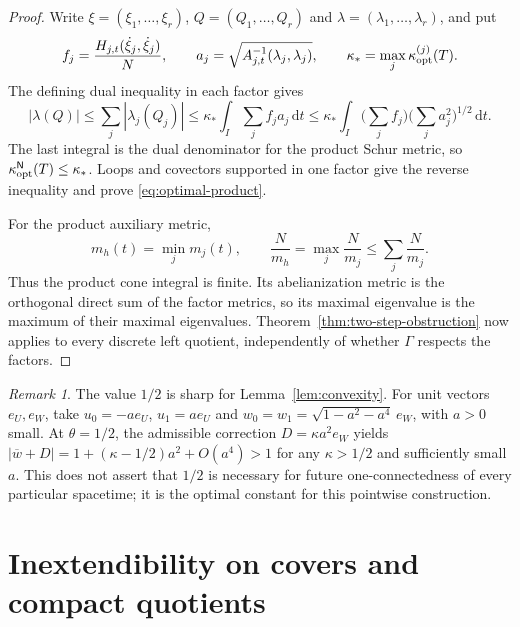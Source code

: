 \documentclass[10pt,a4paper]{article}
\numberwithin{equation}{section}
\theoremstyle{definition}
\theoremstyle{remark}
\newtheorem{remark}[theorem]{Remark}
\newcommand{\dd}{\mathrm d}
\begin{document}
\begin{proof}
Write $\xi=(\xi_1,\ldots,\xi_r)$,
$Q=(Q_1,\ldots,Q_r)$ and
$\lambda=(\lambda_1,\ldots,\lambda_r)$, and put
\[
 f_j=\frac{H_{j,t}(\dot\xi_j,\dot\xi_j)}{N},\qquad
 a_j=\sqrt{A_{j,t}^{-1}(\lambda_j,\lambda_j)},\qquad
 \kappa_*=\max_j\kappa_{\rm opt}^{(j)}(T).
\]
The defining dual inequality in each factor gives
\[
 |\lambda(Q)|
 \le\sum_j|\lambda_j(Q_j)|
 \le\kappa_*\int_I\sum_j f_ja_j\,\dd t
 \le\kappa_*\int_I
       \Big(\sum_jf_j\Big)\Big(\sum_ja_j^2\Big)^{1/2}\,\dd t.
\]
The last integral is the dual denominator for the product Schur metric,
so $\kappa_{\rm opt}^{\mathsf N}(T)\le\kappa_*$.  Loops and covectors
supported in one factor give the reverse inequality and prove
\eqref{eq:optimal-product}.

For the product auxiliary metric,
\[
 m_h(t)=\min_jm_j(t),\qquad
 \frac{N}{m_h}=\max_j\frac{N}{m_j}
 \le\sum_j\frac{N}{m_j}.
\]
Thus the product cone integral is finite.  Its abelianization metric is
the orthogonal direct sum of the factor metrics, so its maximal
eigenvalue is the maximum of their maximal eigenvalues.
Theorem~\ref{thm:two-step-obstruction} now applies to every discrete left
quotient, independently of whether $\Gamma$ respects the factors.
\end{proof}

\begin{remark}
The value $1/2$ is sharp for Lemma~\ref{lem:convexity}.  For unit vectors
$e_U,e_W$, take $u_0=-a e_U$, $u_1=a e_U$ and
$w_0=w_1=\sqrt{1-a^2-a^4}\,e_W$, with $a>0$ small.  At
$\theta=1/2$, the admissible correction $D=\kappa a^2 e_W$ yields
$|\overline w+D|=1+(\kappa-1/2)a^2+O(a^4)>1$ for any
$\kappa>1/2$ and sufficiently small $a$.
This does not assert that $1/2$ is necessary for
future one-connectedness of every particular spacetime; it is the optimal
constant for this pointwise construction.
\end{remark}

\section{Inextendibility on covers and compact quotients}
\label{sec:obstruction}
\end{document}
